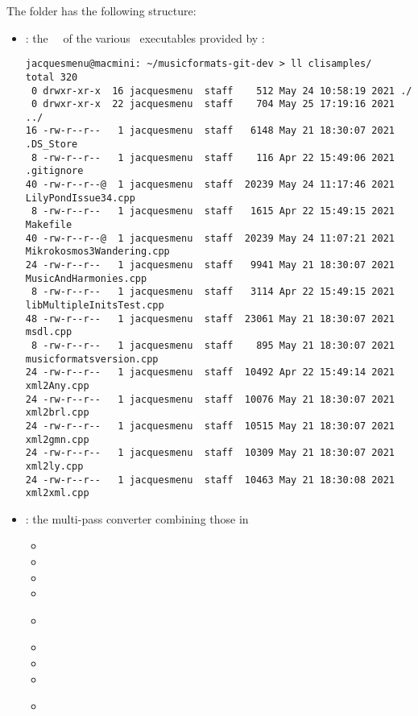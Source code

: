 The  folder has the following structure:%

\begin{itemize}

\item {} : the \mainFunction\ \functions\ of the various \CLI\ executables provided by \mf: %
\begin{lstlisting}[language=Terminal]
jacquesmenu@macmini: ~/musicformats-git-dev > ll clisamples/
total 320
 0 drwxr-xr-x  16 jacquesmenu  staff    512 May 24 10:58:19 2021 ./
 0 drwxr-xr-x  22 jacquesmenu  staff    704 May 25 17:19:16 2021 ../
16 -rw-r--r--   1 jacquesmenu  staff   6148 May 21 18:30:07 2021 .DS_Store
 8 -rw-r--r--   1 jacquesmenu  staff    116 Apr 22 15:49:06 2021 .gitignore
40 -rw-r--r--@  1 jacquesmenu  staff  20239 May 24 11:17:46 2021 LilyPondIssue34.cpp
 8 -rw-r--r--   1 jacquesmenu  staff   1615 Apr 22 15:49:15 2021 Makefile
40 -rw-r--r--@  1 jacquesmenu  staff  20239 May 24 11:07:21 2021 Mikrokosmos3Wandering.cpp
24 -rw-r--r--   1 jacquesmenu  staff   9941 May 21 18:30:07 2021 MusicAndHarmonies.cpp
 8 -rw-r--r--   1 jacquesmenu  staff   3114 Apr 22 15:49:15 2021 libMultipleInitsTest.cpp
48 -rw-r--r--   1 jacquesmenu  staff  23061 May 21 18:30:07 2021 msdl.cpp
 8 -rw-r--r--   1 jacquesmenu  staff    895 May 21 18:30:07 2021 musicformatsversion.cpp
24 -rw-r--r--   1 jacquesmenu  staff  10492 Apr 22 15:49:14 2021 xml2Any.cpp
24 -rw-r--r--   1 jacquesmenu  staff  10076 May 21 18:30:07 2021 xml2brl.cpp
24 -rw-r--r--   1 jacquesmenu  staff  10515 May 21 18:30:07 2021 xml2gmn.cpp
24 -rw-r--r--   1 jacquesmenu  staff  10309 May 21 18:30:07 2021 xml2ly.cpp
24 -rw-r--r--   1 jacquesmenu  staff  10463 May 21 18:30:08 2021 xml2xml.cpp
\end{lstlisting}

\item {} : the multi-pass converter combining those in 
  \begin{itemize}
  \item {}
  \item {}
  \item {}
  \item {}
  \item {}\\[-0.5ex]

  \item {}
  \item {}
  \item {}
  \item {}\\[-0.5ex]


\end{itemize}
\end{itemize}
